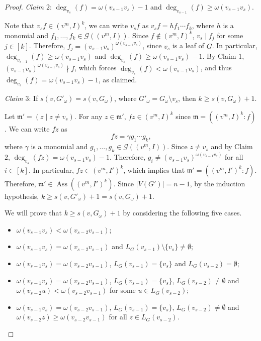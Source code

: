 \documentclass[10pt,a4paper]{amsart}
\DeclareMathOperator{\ass}{Ass}
\def\m {\mathfrak m}
\begin{document}
\begin{proof}
\medskip

{\it Claim $2$}: $\deg_{v_s}(f) = \omega(v_{s-1}v_{s})-1$ and $\deg_{v_{s-1}}(f)\geqslant \omega(v_{s-1}v_{s})$. 

Note that  $v_sf\in (v^m,I)^k$, we can write $v_{s}f$ as $v_{s}f= hf_1\cdots f_k$, where $h$ is a monomial and $f_1,\ldots,f_k\in \mathcal{G}((v^m,I))$. Since  $f\notin (v^m,I)^k$,    $v_{s}\mid f_j$ for some $j\in [k]$. Therefore,  $f_j=(v_{s-1}v_{s})^{\omega(v_{s-1}v_{s})}$, since  $v_{s}$ is a leaf of $G$.
In particular, $\deg_{v_{s-1}}(f) \geqslant \omega(v_{s-1}v_{s})$ and $\deg_{v_{s}}(f) \geqslant \omega(v_{s-1}v_{s})-1$.  By Claim $1$, $(v_{s-1}v_{s})^{\omega(v_{s-1}v_{s})}\nmid f$, which forces $\deg_{v_{s}}(f) < \omega(v_{s-1}v_{s})$, and thus $\deg_{v_{s}}(f) = \omega(v_{s-1}v_{s})-1$, as claimed.


\medskip
{\it Claim $3$}: If $s(v,G'_\omega)=s(v,G_\omega)$,  where $G'_{\omega}=G_\omega\setminus v_s$, then $k\ge s(v,G_\omega)+1$. 

Let $\m'=(z\mid z\neq v_s)$. For any $z\in \m'$,  $fz\in (v^m,I)^k$ since $\m = ((v^m,I)^k \colon f)$. 
We can write $fz$ as 
\[
fz = \gamma g_1\cdots g_k,
\]
where $\gamma$ is a monomial and $g_1,\ldots,g_k\in \mathcal{G}((v^m,I))$. Since  $z\ne v_{s}$ and by  Claim $2$,  $\deg_{v_{s}}(fz)=\omega(v_{s-1}v_{s})-1$. Therefore,  $g_i\ne (v_{s-1}v_{s})^{\omega(v_{s-1}v_{s})}$ for all $i\in [k]$. In particular, $fz\in (v^m,I')^k$, which implies that  $\m'=((v^m,I')^k\colon f)$. Therefore, $\m'\in \ass((v^m,I')^k)$. Since $|V(G')| = n-1$, by the induction hypothesis, $k\geqslant s(v,G'_{\omega})+1=s(v,G_{\omega})+1$.

\medskip
 We will prove that $k\geqslant s(v,G_{\omega})+1$ by considering the following five cases.
\begin{itemize}
     \item[(i)]  $\omega(v_{s-1}v_{s}) < \omega(v_{s-2}v_{s-1})$;
      \item[(ii)]  $\omega(v_{s-1}v_{s}) = \omega(v_{s-2}v_{s-1})$ and $L_G(v_{s-1})\setminus \{v_s\}\ne \emptyset$;
    \item[(iii)] $\omega(v_{s-1}v_{s})=\omega(v_{s-2}v_{s-1})$,  $L_G(v_{s-1})=\{v_s\}$ and $L_G(v_{s-2})= \emptyset$;
    \item[(iv)] $\omega(v_{s-1}v_{s}) = \omega(v_{s-2}v_{s-1})$,  $L_G(v_{s-1})=\{v_s\}$,  $L_G(v_{s-2})\ne \emptyset$ and $\omega(v_{s-2}u) < \omega(v_{s-2}v_{s-1})$ for some $u\in L_G(v_{s-2})$; 
    \item[(v)] $\omega(v_{s-1}v_{s}) = \omega(v_{s-2}v_{s-1})$,  $L_G(v_{s-1})=\{v_s\}$,  $L_G(v_{s-2})\ne \emptyset$ and $\omega(v_{s-2}z) \ge \omega(v_{s-2}v_{s-1})$ for all $z\in L_G(v_{s-2})$.
\end{itemize}


\end{proof}
\end{document}
